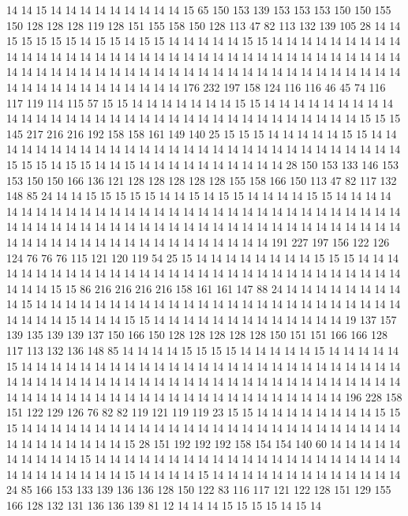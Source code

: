 14 14 15 14 14 14 14 14 14 14 14 14 15 65 150 153 139 153 153 153
150 150 155 150 128 128 128 119 128 151 155 158 150 128 113 47 82 113 132 139
105 28 14 14 15 15 15 15 15 14 15 15 14 15 15 14 14 14 14 14
15 15 14 14 14 14 14 14 14 14 14 14 14 14 14 14 14 14 14 14
14 14 14 14 14 14 14 14 14 14 14 14 14 14 14 14 14 14 14 14
14 14 14 14 14 14 14 14 14 14 14 14 14 14 14 14 14 14 14 14
14 14 14 14 14 14 14 14 14 14 14 14 14 14 14 14 14 176 232 197
158 124 116 116 46 45 74 116 117 119 114 115 57 15 15 14 14 14 14 14
14 14 15 15 14 14 14 14 14 14 14 14 14 14 14 14 14 14 14 14
14 14 14 14 14 14 14 14 14 14 14 14 14 14 14 14 14 15 15 15
145 217 216 216 192 158 158 161 149 140 25 15 15 15 14 14 14 14 14 15
15 14 14 14 14 14 14 14 14 14 14 14 14 14 14 14 14 14 14 14
14 14 14 14 14 14 14 14 14 14 15 15 15 14 15 15 14 14 15 14
14 14 14 14 14 14 14 14 14 28 150 153 133 146 153 153 150 150 166 136
121 128 128 128 128 128 155 158 166 150 113 47 82 117 132 148 85 24 14 14
15 15 15 15 15 14 14 15 14 15 15 14 14 14 14 15 15 14 14 14
14 14 14 14 14 14 14 14 14 14 14 14 14 14 14 14 14 14 14 14
14 14 14 14 14 14 14 14 14 14 14 14 14 14 14 14 14 14 14 14
14 14 14 14 14 14 14 14 14 14 14 14 14 14 14 14 14 14 14 14
14 14 14 14 14 14 14 14 14 14 14 14 14 191 227 197 156 122 126 124
76 76 76 115 121 120 119 54 25 15 14 14 14 14 14 14 14 14 15 15
15 14 14 14 14 14 14 14 14 14 14 14 14 14 14 14 14 14 14 14
14 14 14 14 14 14 14 14 14 14 14 14 14 14 15 15 86 216 216 216
216 158 161 161 147 88 24 14 14 14 14 14 14 14 14 14 15 14 14 14
14 14 14 14 14 14 14 14 14 14 14 14 14 14 14 14 14 14 14 14
14 14 14 14 14 14 15 14 14 14 15 15 14 14 14 14 14 14 14 14
14 14 14 14 14 19 137 157 139 135 139 139 137 150 166 150 128 128 128 128
128 150 151 151 166 166 128 117 113 132 136 148 85 14 14 14 14 15 15 15
15 14 14 14 14 14 15 14 14 14 14 14 15 14 14 14 14 14 14 14
14 14 14 14 14 14 14 14 14 14 14 14 14 14 14 14 14 14 14 14
14 14 14 14 14 14 14 14 14 14 14 14 14 14 14 14 14 14 14 14
14 14 14 14 14 14 14 14 14 14 14 14 14 14 14 14 14 14 14 14
14 14 14 14 14 14 14 14 14 196 228 158 151 122 129 126 76 82 82 119
121 119 119 23 15 15 14 14 14 14 14 14 14 14 15 15 15 14 14 14
14 14 14 14 14 14 14 14 14 14 14 14 14 14 14 14 14 14 14 14
14 14 14 14 14 14 14 14 14 14 14 15 28 151 192 192 192 158 154 154
140 60 14 14 14 14 14 14 14 14 14 14 15 14 14 14 14 14 14 14
14 14 14 14 14 14 14 14 14 14 14 14 14 14 14 14 14 14 14 14
14 14 15 14 14 14 14 15 14 14 14 14 14 14 14 14 14 14 14 14
14 24 85 166 153 133 139 136 136 128 150 122 83 116 117 121 122 128 151 129
155 166 128 132 131 136 136 139 81 12 14 14 14 15 15 15 15 14 15 14
